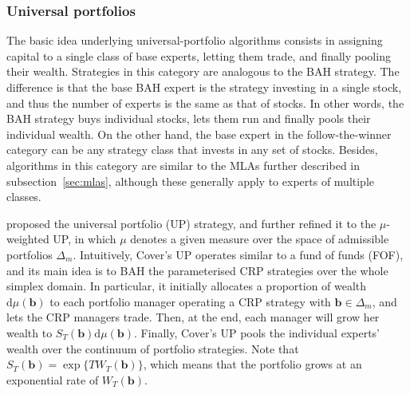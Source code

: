 \subsubsection{Universal portfolios}

The basic idea underlying universal-portfolio algorithms consists in assigning capital to a single class of base experts, letting them trade, and finally pooling their wealth. Strategies in this category are analogous to the BAH strategy. The difference is that the base BAH expert is the strategy investing in a single stock, and thus the number of experts is the same as that of stocks. In other words, the BAH strategy buys individual stocks, lets them run and finally pools their individual wealth. On the other hand, the base expert in the follow-the-winner category can be any strategy class that invests in any set of stocks. Besides, algorithms in this category are similar to the MLAs further described in subsection~\ref{sec:mlas}, although these generally apply to experts of multiple classes.

\citet{cover} proposed the universal portfolio (UP) strategy, and \citet{cover96} further refined it to the $\mu$-weighted UP, in which $\mu$ denotes a given measure over the space of admissible portfolios $\Delta_m$. Intuitively, Cover's UP operates similar to a fund of funds (FOF), and its main idea is to BAH the parameterised CRP strategies over the whole simplex domain. In particular, it initially allocates a proportion of wealth $\mathrm{d}\mu(\mathbf{b})$ to each portfolio manager operating a CRP strategy with $\mathbf{b} \in \Delta_m$, and lets the CRP managers trade. Then, at the end, each manager will grow her wealth to $S_{T}(\mathbf{b})\mathrm{d}\mu(\mathbf{b})$. Finally, Cover's UP pools the individual experts' wealth over the continuum of portfolio strategies. Note that $S_{T}(\mathbf{b}) = \exp\{T W_{T}(\mathbf{b})\}$, which means that the portfolio grows at an exponential rate of $W_{T}(\mathbf{b})$.

